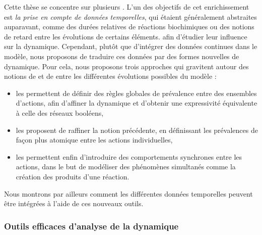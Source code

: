 Cette thèse se concentre sur plusieurs .
L'un des objectifs de cet enrichissement est \emph{la prise en compte de données temporelles},
qui étaient généralement abstraites auparavant,
comme des durées relatives de réactions biochimiques
ou des notions de retard entre les évolutions de certains éléments.
afin d'étudier leur influence sur la dynamique.
Cependant, plutôt que d'intégrer des données continues dans le modèle,
nous proposons de traduire ces données par des formes nouvelles de dynamique.
Pour cela, nous proposons trois approches qui gravitent autour des notions
de  et de  entre les différentes
évolutions possibles du modèle :
\begin{itemize}
  \item les  permettent de définir des règles globales de prévalence
    entre des ensembles d'actions, afin d'affiner la dynamique et d'obtenir une expressivité
    équivalente à celle des réseaux booléens,
  \item les  proposent de raffiner la notion précédente,
    en définissant les prévalences de façon plus atomique entre les actions individuelles,
  \item les  permettent enfin d'introduire des comportements
    synchrones entre les actions, dans le but de modéliser des phénomènes simultanés
    comme la création des produits d'une réaction.
\end{itemize}
Nous montrons par ailleurs comment les différentes données temporelles peuvent être
intégrées à l'aide de ces nouveaux outils.

\subsubsection*{Outils efficaces d'analyse de la dynamique}

